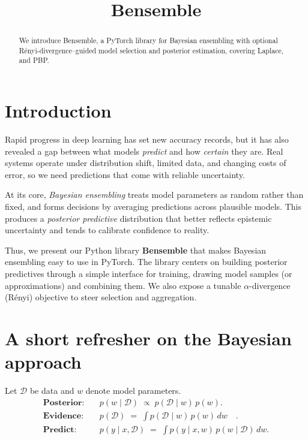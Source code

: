 \documentclass[11pt]{article}
\title{Bensemble}
\date{\year}
\begin{document}
\maketitle

\begin{abstract}
We introduce Bensemble, a PyTorch library for Bayesian ensembling with optional Rényi-divergence–guided model selection and posterior estimation, covering Laplace, and PBP.
\end{abstract}

\section{Introduction}
Rapid progress in deep learning has set new accuracy records, but it has also revealed a gap between what models \emph{predict} and how \emph{certain} they are. Real systems operate under distribution shift, limited data, and changing costs of error, so we need predictions that come with reliable uncertainty.

At its core, \emph{Bayesian ensembling} treats model parameters as random rather than fixed, and forms decisions by averaging predictions across plausible models. This produces a \emph{posterior predictive} distribution that better reflects epistemic uncertainty and tends to calibrate confidence to reality.

Thus, we present our Python library \textbf{Bensemble} that makes Bayesian ensembling easy to use in PyTorch. The library centers on building posterior predictives through a simple interface for training, drawing model samples (or approximations) and combining them. We also expose a tunable $\alpha$-divergence (R\'enyi) objective to steer selection and aggregation.


\section{A short refresher on the Bayesian approach}
Let $\mathcal{D}$ be data and $w$ denote model parameters.
\begin{align}
\textbf{Posterior:}\quad & p(w \mid \mathcal{D}) \;\propto\; p(\mathcal{D}\mid w)\,p(w). \\
\textbf{Evidence:}\quad & p(\mathcal{D}) \;=\; \int p(\mathcal{D}\mid w)\,p(w)\,dw \quad. \\
\textbf{Predict:}\quad & p(y\mid x,\mathcal{D}) \;=\; \int p(y\mid x,w)\,p(w\mid \mathcal{D})\,dw.
\end{align}
\end{document}
